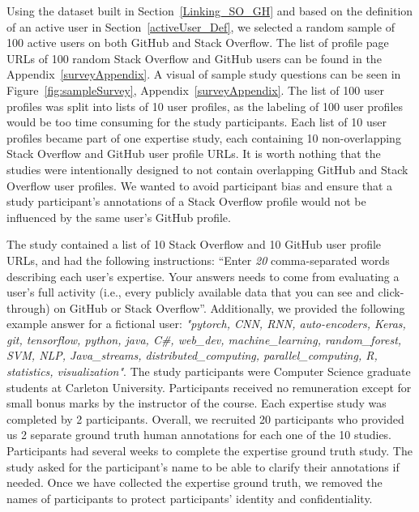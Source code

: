            Using the dataset built in Section~\ref{Linking_SO_GH} and based on the definition of an active user in Section~\ref{activeUser_Def}, we selected a random sample of 100 active users on both GitHub and Stack Overflow. The list of profile page URLs of 100 random Stack Overflow and GitHub users can be found in the Appendix~\ref{surveyAppendix}. A visual of sample study questions can be seen in Figure~\ref{fig:sampleSurvey}, Appendix~\ref{surveyAppendix}. The list of 100 user profiles was split into lists of 10 user profiles, as the labeling of 100 user profiles would be too time consuming for the study participants. Each list of 10 user profiles became part of one expertise study, each containing 10 non-overlapping Stack Overflow and GitHub user profile URLs. It is worth nothing that the studies were intentionally designed to not contain overlapping GitHub and Stack Overflow user profiles. We wanted to avoid participant bias and ensure that a study participant's annotations of a Stack Overflow profile would not be influenced by the same user's GitHub profile.
            
            The study contained a list of 10 Stack Overflow and 10 GitHub user profile URLs, and had the following instructions: ``Enter \emph{20} comma-separated words describing each user's expertise. Your answers needs to come from evaluating a user's full activity (i.e., every publicly available data that you can see and click-through) on GitHub or Stack Overflow''. Additionally, we provided the following example answer for a fictional user: \emph{"pytorch, CNN, RNN, auto-encoders, Keras, git, tensorflow, python, java, C\#, web\_dev, machine\_learning, random\_forest, SVM, NLP, Java\_streams, distributed\_computing, parallel\_computing, R, statistics, visualization"}. The study participants were Computer Science graduate students at Carleton University. Participants received no remuneration except for small bonus marks by the instructor of the course.
            Each expertise study was completed by 2 participants. Overall, we recruited 20 participants who provided us 2 separate ground truth human annotations for each one of the 10 studies. Participants had several weeks to complete the expertise ground truth study. The study asked for the participant's name to be able to clarify their annotations if needed. Once we have collected the expertise ground truth, we removed the names of participants to protect participants' identity and confidentiality.  
        
